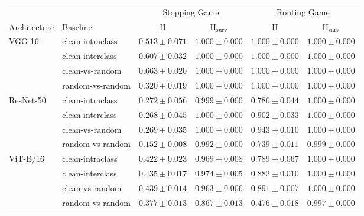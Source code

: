 \begin{tabular}{l l cc cc}
  \toprule
  & & \multicolumn{2}{c}{Stopping Game} & \multicolumn{2}{c}{Routing Game} \\
  \cmidrule(lr){3-4} \cmidrule(lr){5-6}
  Architecture & Baseline & $\mathrm{H}$ & $\mathrm{H}_{\mathrm{surv}}$ & $\mathrm{H}$ & $\mathrm{H}_{\mathrm{surv}}$ \\
  \midrule
    \multirow{4}{*}{VGG-16} & clean-intraclass   & $0.513 \pm 0.071$ & $1.000 \pm 0.000$ & $1.000 \pm 0.000$ & $1.000 \pm 0.000$ \\
                               & clean-interclass   & $0.607 \pm 0.032$ & $1.000 \pm 0.000$ & $1.000 \pm 0.000$ & $1.000 \pm 0.000$ \\
                               & clean-vs-random    & $0.663 \pm 0.020$ & $1.000 \pm 0.000$ & $1.000 \pm 0.000$ & $1.000 \pm 0.000$ \\
                               & random-vs-random   & $0.320 \pm 0.019$ & $1.000 \pm 0.000$ & $1.000 \pm 0.000$ & $1.000 \pm 0.000$ \\
    \midrule
    \multirow{4}{*}{ResNet-50} & clean-intraclass   & $0.272 \pm 0.056$ & $0.999 \pm 0.000$ & $0.786 \pm 0.044$ & $1.000 \pm 0.000$ \\
                               & clean-interclass   & $0.268 \pm 0.045$ & $1.000 \pm 0.000$ & $0.902 \pm 0.033$ & $1.000 \pm 0.000$ \\
                               & clean-vs-random    & $0.269 \pm 0.035$ & $1.000 \pm 0.000$ & $0.943 \pm 0.010$ & $1.000 \pm 0.000$ \\
                               & random-vs-random   & $0.152 \pm 0.008$ & $0.992 \pm 0.000$ & $0.739 \pm 0.011$ & $0.999 \pm 0.000$ \\
    \midrule
    \multirow{4}{*}{ViT-B/16} & clean-intraclass   & $0.422 \pm 0.023$ & $0.969 \pm 0.008$ & $0.789 \pm 0.067$ & $1.000 \pm 0.000$ \\
                               & clean-interclass   & $0.435 \pm 0.017$ & $0.974 \pm 0.005$ & $0.882 \pm 0.010$ & $1.000 \pm 0.000$ \\
                               & clean-vs-random    & $0.439 \pm 0.014$ & $0.963 \pm 0.006$ & $0.891 \pm 0.007$ & $1.000 \pm 0.000$ \\
                               & random-vs-random   & $0.377 \pm 0.013$ & $0.867 \pm 0.013$ & $0.476 \pm 0.018$ & $0.997 \pm 0.000$ \\
  \bottomrule
\end{tabular}

